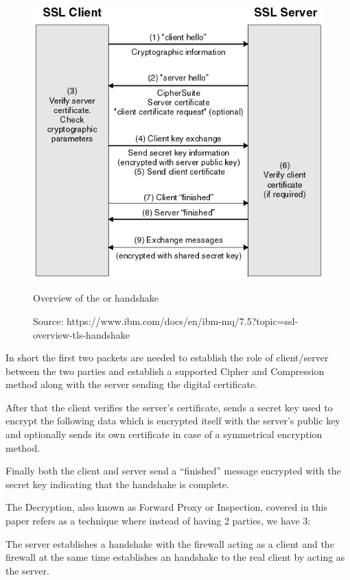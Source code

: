 \begin{figure}[!hb]
 \centering
 \includegraphics[width=13cm]{img/ssl_handshake.png}
 \caption{Overview of the  or  handshake}
 \caption*{Source: https://www.ibm.com/docs/en/ibm-mq/7.5?topic=ssl-overview-tls-handshake}
 \label{SSL handshake}
\end{figure}

In short the first two packets are needed to establish the role of client/server between the two parties and establish a supported Cipher and Compression method along with the server sending the digital certificate.

After that the client verifies the server's certificate, sends a secret key used to encrypt the following data which is encrypted itself with the server's public key and optionally sends its own certificate in case of a symmetrical encryption method.

Finally both the client and server send a ``finished'' message encrypted with the secret key indicating that the handshake is complete.

The  Decryption, also known as  Forward Proxy or  Inspection, covered in this paper refers as a technique where instead of having  2 parties, we have 3:

The server establishes a handshake with the firewall acting as a client and the firewall at the same time establishes an handshake to the real client by acting as the server.

